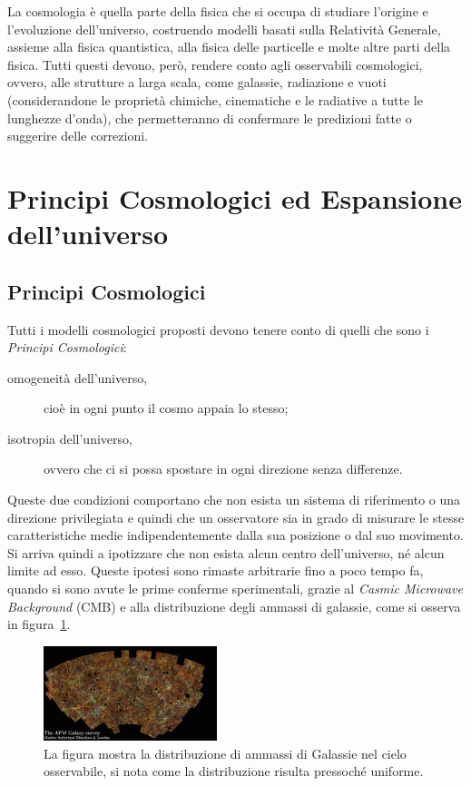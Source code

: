 La cosmologia è quella parte della fisica che si occupa di studiare l'origine e l'evoluzione dell'universo, costruendo modelli basati sulla Relatività Generale, assieme alla fisica quantistica, alla fisica delle particelle e molte altre parti della fisica. Tutti questi devono, però, rendere conto agli osservabili cosmologici, ovvero, alle strutture a larga scala, come galassie, radiazione e vuoti (considerandone le proprietà chimiche, cinematiche e le radiative a tutte le lunghezze d'onda), che permetteranno di confermare le predizioni fatte o suggerire delle correzioni.
\section{Principi Cosmologici ed Espansione dell'universo}\label{sec:principi-espansione}
\subsection{Principi Cosmologici}\label{sec:principi-cosmologici}

Tutti i modelli cosmologici proposti devono tenere conto di quelli che sono i \emph{Principi Cosmologici}:
\begin{description}
    \item[omogeneità dell'universo,]cioè in ogni punto il cosmo appaia lo stesso;
    \item[isotropia dell'universo,]ovvero che ci si possa spostare in ogni direzione senza differenze.
\end{description}
Queste due condizioni comportano che non esista un sistema di riferimento o una direzione privilegiata e quindi che un osservatore sia in grado di misurare le stesse caratteristiche medie indipendentemente dalla sua posizione o dal suo movimento. Si arriva quindi a ipotizzare che non esista alcun centro dell'universo, né alcun limite ad esso. Queste ipotesi sono rimaste arbitrarie fino a poco tempo fa, quando si sono avute le prime conferme sperimentali, grazie al \emph{Casmic Microwave Background} (CMB) e alla distribuzione degli ammassi di galassie, come si osserva in figura~\ref{fig:APM}.
\begin{figure}
    \centering
    \includegraphics[width=0.45\textwidth]{immagini/APM.png}
    \caption{La figura mostra la distribuzione di ammassi di Galassie nel cielo osservabile, si nota come la distribuzione risulta pressoché uniforme.}\label{fig:APM}
\end{figure}

